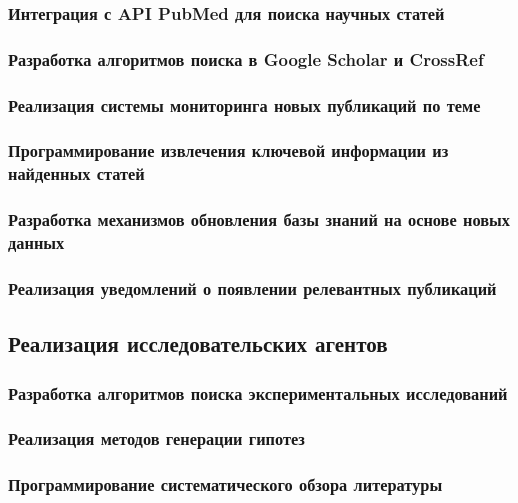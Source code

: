 \documentclass{syksu-coursework}
\begin{document}
\subsubsection{Интеграция с API PubMed для поиска научных статей}

\subsubsection{Разработка алгоритмов поиска в Google Scholar и CrossRef}

\subsubsection{Реализация системы мониторинга новых публикаций по теме}

\subsubsection{Программирование извлечения ключевой информации из найденных статей}

\subsubsection{Разработка механизмов обновления базы знаний на основе новых данных}

\subsubsection{Реализация уведомлений о появлении релевантных публикаций}

\subsection{Реализация исследовательских агентов}

\subsubsection{Разработка алгоритмов поиска экспериментальных исследований}

\subsubsection{Реализация методов генерации гипотез}

\subsubsection{Программирование систематического обзора литературы}
\end{document}
